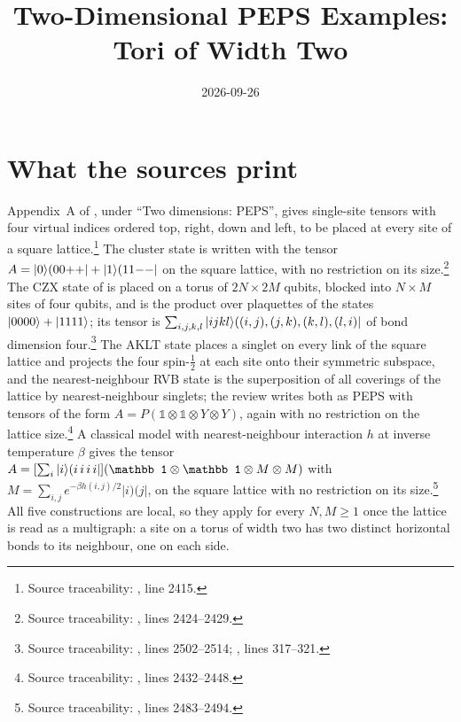 \documentclass{article}
\title{Two-Dimensional PEPS Examples: Tori of Width Two}
\author{}
\date{2026-09-26}
\begin{document}
\maketitle
{}

\section{What the sources print}
Appendix~A of \cite{Cirac2021Matrix}, under ``Two dimensions: PEPS'', gives
single-site tensors with four virtual indices ordered top, right, down and
left, to be placed at every site of a square lattice.\footnote{Source
    traceability: , line 2415.}
The cluster state is written with the tensor
$A=|0\rangle(00{+}{+}|+|1\rangle(11{-}{-}|$ on the square lattice, with no
restriction on its size.\footnote{Source traceability:
    , lines 2424--2429.}
The CZX state of \cite{ChenLiuWen2011CZX} is placed on a torus of
$2N\times 2M$ qubits, blocked into $N\times M$ sites of four qubits, and is
the product over plaquettes of the states $|0000\rangle+|1111\rangle$; its tensor
is $\sum_{i,j,k,l}|ijkl\rangle((i,j),(j,k),(k,l),(l,i)|$ of bond dimension
four.\footnote{Source traceability:
    , lines 2502--2514;
    , lines 317--321.}
The AKLT state places a singlet on every link of the square lattice and
projects the four spin-$\tfrac12$ at each site onto their symmetric
subspace, and the nearest-neighbour RVB state is the superposition of all
coverings of the lattice by nearest-neighbour singlets; the review writes
both as PEPS with tensors of the form
$A=P(\mathbb 1\otimes\mathbb 1\otimes Y\otimes Y)$, again with no
restriction on the lattice size.\footnote{Source traceability:
    , lines 2432--2448.}
A classical model with nearest-neighbour interaction $h$ at inverse
temperature $\beta$ gives the tensor
$A=[\sum_i\ket{i}(i\,i\,i\,i|](\mathbb 1\otimes\mathbb 1\otimes M\otimes M)$
with $M=\sum_{i,j}e^{-\beta h(i,j)/2}|i)(j|$, on the square lattice with no
restriction on its size.\footnote{Source traceability:
    , lines 2483--2494.}
All five constructions are local, so they apply for every $N,M\ge 1$ once the
lattice is read as a multigraph: a site on a torus of width two has two
distinct horizontal bonds to its neighbour, one on each side.
\end{document}
